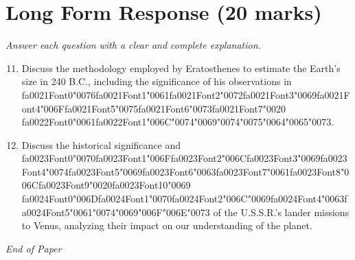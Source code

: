 \documentclass[12pt]{article}
\begin{document}
\section*{Long Form Response (20 marks)}
\textit{Answer each question with a clear and complete explanation.}
\begin{enumerate}[label=\arabic*.]
\setcounter{enumi}{10}
\item Discuss the methodology employed by Eratosthenes to estimate the Earth's size in 240 B.C.,
including the significance of his observations in {\csname fa0021Font0\endcsname\char"0076}{\csname fa0021Font1\endcsname\char"0061}{\csname fa0021Font2\endcsname\char"0072}{\csname fa0021Font3\endcsname\char"0069}{\csname fa0021Font4\endcsname\char"006F}{\csname fa0021Font5\endcsname\char"0075}{\csname fa0021Font6\endcsname\char"0073}{\csname fa0021Font7\endcsname\char"0020} {\csname fa0022Font0\endcsname\char"0061}{\csname fa0022Font1\endcsname\char"006C}{\char"0074}{\char"0069}{\char"0074}{\char"0075}{\char"0064}{\char"0065}{\char"0073}.
\item Discuss the historical significance and {\csname fa0023Font0\endcsname\char"0070}{\csname fa0023Font1\endcsname\char"006F}{\csname fa0023Font2\endcsname\char"006C}{\csname fa0023Font3\endcsname\char"0069}{\csname fa0023Font4\endcsname\char"0074}{\csname fa0023Font5\endcsname\char"0069}{\csname fa0023Font6\endcsname\char"0063}{\csname fa0023Font7\endcsname\char"0061}{\csname fa0023Font8\endcsname\char"006C}{\csname fa0023Font9\endcsname\char"0020}{\csname fa0023Font10\endcsname\char"0069} {\csname fa0024Font0\endcsname\char"006D}{\csname fa0024Font1\endcsname\char"0070}{\csname fa0024Font2\endcsname\char"006C}{\char"0069}{\csname fa0024Font4\endcsname\char"0063}{\csname fa0024Font5\endcsname\char"0061}{\char"0074}{\char"0069}{\char"006F}{\char"006E}{\char"0073} of the U.S.S.R.'s lander
missions to Venus, analyzing their impact on our understanding of the planet.
\end{enumerate}

\vfill
\noindent\textit{End of Paper}
\end{document}

